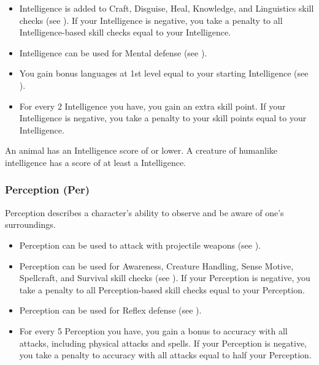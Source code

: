             \begin{itemize}
                \item Intelligence is added to Craft, Disguise, Heal, Knowledge, and Linguistics skill checks (see ). If your Intelligence is negative, you take a penalty to all Intelligence-based skill checks equal to your Intelligence.
                \item Intelligence can be used for Mental defense (see ).
                \item You gain bonus languages at 1st level equal to your starting Intelligence (see ).
                \item For every 2 Intelligence you have, you gain an extra skill point. If your Intelligence is negative, you take a penalty to your skill points equal to your Intelligence.
            \end{itemize}

            \par An animal has an Intelligence score of  or lower.
            A creature of humanlike intelligence has a score of at least a  Intelligence.

        \subsubsection{Perception (Per)}\label{Perception}
            Perception describes a character's ability to observe and be aware of one's surroundings.
            \begin{itemize}
                \item Perception can be used to attack with projectile weapons (see ).
                \item Perception can be used for Awareness, Creature Handling, Sense Motive, Spellcraft, and Survival skill checks (see ). If your Perception is negative, you take a penalty to all Perception-based skill checks equal to your Perception.
                \item Perception can be used for Reflex defense (see ).
                \item For every 5 Perception you have, you gain a  bonus to accuracy with all attacks, including physical attacks and spells.
                    If your Perception is negative, you take a penalty to accuracy with all attacks equal to half your Perception.
            \end{itemize}

